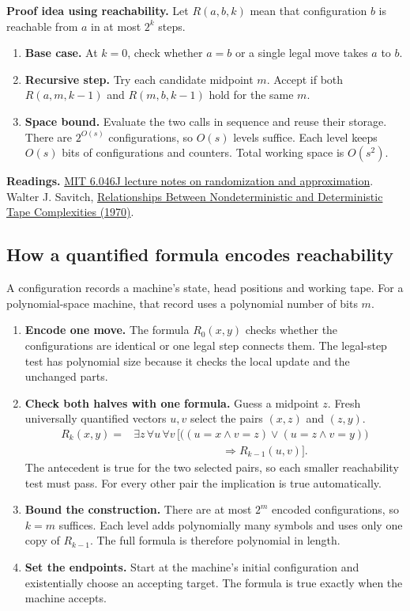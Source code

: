 \documentclass[12pt,a4paper]{article}
\begin{document}
\textbf{Proof idea using reachability.} Let $R(a,b,k)$ mean that configuration $b$ is reachable from $a$ in at most $2^k$ steps.
\begin{enumerate}[leftmargin=*, itemsep=3pt]
  \item \textbf{Base case.} At $k=0$, check whether $a=b$ or a single legal move takes $a$ to $b$.
  \item \textbf{Recursive step.} Try each candidate midpoint $m$. Accept if both $R(a,m,k-1)$ and $R(m,b,k-1)$ hold for the same $m$.
  \item \textbf{Space bound.} Evaluate the two calls in sequence and reuse their storage. There are $2^{O(s)}$ configurations, so $O(s)$ levels suffice. Each level keeps $O(s)$ bits of configurations and counters. Total working space is $O(s^2)$.
\end{enumerate}

\textbf{Readings.} \href{https://ocw.mit.edu/courses/6-046j-design-and-analysis-of-algorithms-spring-2015/pages/lecture-notes/}{MIT 6.046J lecture notes on randomization and approximation}. Walter J. Savitch, \href{https://doi.org/10.1016/S0022-0000(70)80006-X}{Relationships Between Nondeterministic and Deterministic Tape Complexities (1970)}.

\subsection{How a quantified formula encodes reachability}
A configuration records a machine's state, head positions and working tape. For a polynomial-space machine, that record uses a polynomial number of bits $m$.

\begin{enumerate}[leftmargin=*, itemsep=3pt]
  \item \textbf{Encode one move.} The formula $R_0(x,y)$ checks whether the configurations are identical or one legal step connects them. The legal-step test has polynomial size because it checks the local update and the unchanged parts.
  \item \textbf{Check both halves with one formula.} Guess a midpoint $z$. Fresh universally quantified vectors $u,v$ select the pairs $(x,z)$ and $(z,y)$.
  \[
  \begin{aligned}
  R_k(x,y)={}&\exists z\,\forall u\,\forall v\,\big[
    \big((u=x\land v=z)\lor(u=z\land v=y)\big)\\
    &\hspace{8em}\Longrightarrow R_{k-1}(u,v)\big].
  \end{aligned}
  \]
  The antecedent is true for the two selected pairs, so each smaller reachability test must pass. For every other pair the implication is true automatically.
  \item \textbf{Bound the construction.} There are at most $2^m$ encoded configurations, so $k=m$ suffices. Each level adds polynomially many symbols and uses only one copy of $R_{k-1}$. The full formula is therefore polynomial in length.
  \item \textbf{Set the endpoints.} Start at the machine's initial configuration and existentially choose an accepting target. The formula is true exactly when the machine accepts.
\end{enumerate}
\end{document}
